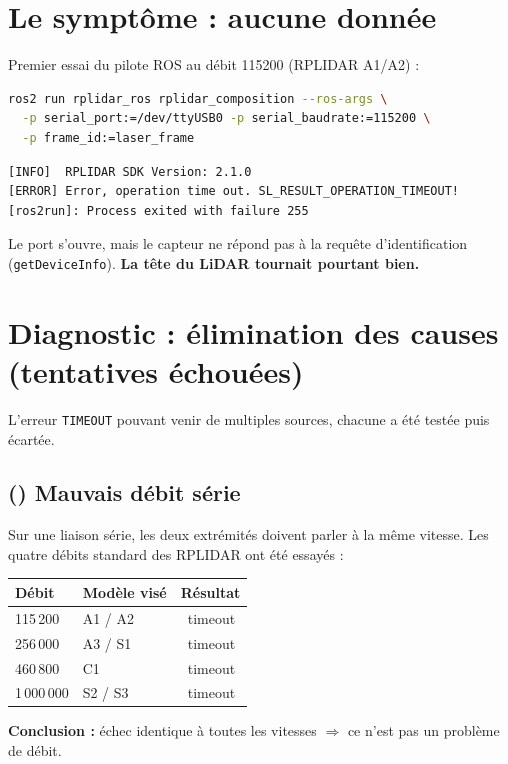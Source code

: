 \documentclass[a4paper,11pt]{article}
\newcommand{\ko}{\textcolor{danger}{\ding{55}}}
\begin{document}
\section{Le symptôme : aucune donnée}
Premier essai du pilote ROS au débit 115200 (RPLIDAR A1/A2) :
\begin{lstlisting}[language=bash]
ros2 run rplidar_ros rplidar_composition --ros-args \
  -p serial_port:=/dev/ttyUSB0 -p serial_baudrate:=115200 \
  -p frame_id:=laser_frame
\end{lstlisting}
\begin{lstlisting}
[INFO]  RPLIDAR SDK Version: 2.1.0
[ERROR] Error, operation time out. SL_RESULT_OPERATION_TIMEOUT!
[ros2run]: Process exited with failure 255
\end{lstlisting}
Le port s'ouvre, mais le capteur ne répond pas à la requête d'identification
(\texttt{getDeviceInfo}). \textbf{La tête du LiDAR tournait pourtant bien.}

\section{Diagnostic : élimination des causes (tentatives échouées)}
L'erreur \texttt{TIMEOUT} pouvant venir de multiples sources, chacune a été
testée puis écartée.

\subsection{(\ko) Mauvais débit série}
Sur une liaison série, les deux extrémités doivent parler à la même vitesse.
Les quatre débits standard des RPLIDAR ont été essayés :
\begin{center}
\begin{tabular}{@{}lll@{}}
\toprule
Débit & Modèle visé & Résultat \\
\midrule
115\,200 & A1 / A2     & \ko\ timeout \\
256\,000 & A3 / S1     & \ko\ timeout \\
460\,800 & C1          & \ko\ timeout \\
1\,000\,000 & S2 / S3  & \ko\ timeout \\
\bottomrule
\end{tabular}
\end{center}
\textbf{Conclusion :} échec identique à toutes les vitesses $\Rightarrow$ ce
n'est pas un problème de débit.
\end{document}
